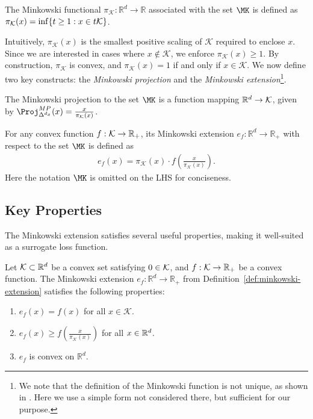 \begin{definition} 
The Minkowski functional $\pi_\mathcal{K}:\mathbb{R}^d\rightarrow\mathbb{R}$ associated with the set $\MK$ is defined as $\pi_{\mathcal{K}}(x)=\inf\{t\ge 1: x\in t\mathcal{K}\}$.
\end{definition}

Intuitively, $\pi_{\mathcal{K}}(x)$ is the smallest positive scaling of $\mathcal{K}$ required to enclose $x$. Since we are interested in cases where $x \notin \mathcal{K}$, we enforce $\pi_{\mathcal{K}}(x) \geq 1$. By construction, $\pi_{\mathcal{K}}$ is convex, and $\pi_{\mathcal{K}}(x) = 1$ if and only if $x \in \mathcal{K}$.
We now define two key constructs: the \emph{Minkowski projection} and the \emph{Minkowski extension}\footnote{We note that the definition of the Minkowski function is not unique, as shown in \citep[Section~3.7]{lattimore2024bandit}. Here we use a simple form not considered there, but sufficient for our purpose.}.

\begin{definition} 
The Minkowski projection to the set $\MK$ is a function mapping $\mathbb{R}^d\rightarrow\mathcal{K}$, given by $\Proj_{\Delta^{d_x}}^{MP}(x)= \frac{x}{\pi_{\K}(x)}$. 
\end{definition}

\begin{definition}\label{def:minkowski-extension}
For any convex function $f:\mathcal{K}\rightarrow\mathbb{R}_+$, its Minkowski extension $e_f:\mathbb{R}^d\rightarrow\mathbb{R}_+$ with respect to the set $\MK$ is defined as
\begin{align}
\label{eq:extension}
e_f(x)=\pi_{\mathcal{K}}(x)\cdot f\left(\frac{x}{\pi_{\mathcal{K}}(x)}\right).
\end{align}
Here the notation $\MK$ is omitted on the LHS for conciseness.
\end{definition}


\subsection{Key Properties}\label{sec:property-minkowski}

The Minkowski extension satisfies several useful properties, making it well-suited as a surrogate loss function.

\begin{lemma} 
\label{lem:extension-property}
Let $\mathcal{K}\subset\mathbb{R}^d$ be a convex set satisfying $0\in\mathcal{K}$, and $f:\mathcal{K}\rightarrow\mathbb{R}_+$ be a convex function. 
The Minkowski extension $e_f:\mathbb{R}^d\rightarrow\mathbb{R}_+$ from Definition~\ref{def:minkowski-extension} satisfies the following properties:
\begin{enumerate}
    \item $e_f(x)=f(x)$ for all $x\in \mathcal{K}$.
    \item $e_f(x)\ge f(\frac{x}{\pi_{\mathcal{K}}(x)})$ for all $x\in\mathbb R^d$.
    \item $e_f$ is convex on $\mathbb{R}^d$.
\end{enumerate}
\end{lemma}

